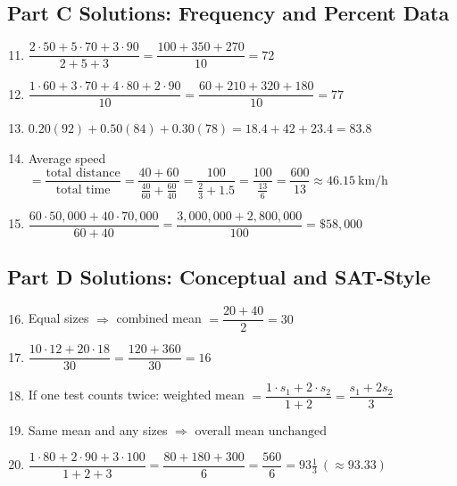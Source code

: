 \documentclass[14pt]{extarticle}
\begin{document}
\subsection*{Part C Solutions: Frequency and Percent Data}
\begin{enumerate}
  \setcounter{enumi}{10}
  \item \(\dfrac{2\cdot50+5\cdot70+3\cdot90}{2+5+3}=\dfrac{100+350+270}{10}=\boxed{72}\)
  \item \(\dfrac{1\cdot60+3\cdot70+4\cdot80+2\cdot90}{10}=\dfrac{60+210+320+180}{10}=\boxed{77}\)
  \item \(0.20(92)+0.50(84)+0.30(78)=18.4+42+23.4=\boxed{83.8}\)
  \item Average speed \(=\dfrac{\text{total distance}}{\text{total time}}=\dfrac{40+60}{\tfrac{40}{60}+\tfrac{60}{40}}=\dfrac{100}{\tfrac{2}{3}+1.5}=\dfrac{100}{\tfrac{13}{6}}=\dfrac{600}{13}\approx\boxed{46.15\ \text{km/h}}\)
  \item \(\dfrac{60\cdot 50{,}000+40\cdot 70{,}000}{60+40}=\dfrac{3{,}000{,}000+2{,}800{,}000}{100}=\boxed{\$58{,}000}\)
\end{enumerate}

\subsection*{Part D Solutions: Conceptual and SAT-Style}
\begin{enumerate}
  \setcounter{enumi}{15}
  \item Equal sizes \(\Rightarrow\) combined mean \(=\dfrac{20+40}{2}=\boxed{30}\)
  \item \(\dfrac{10\cdot12+20\cdot18}{30}=\dfrac{120+360}{30}=\boxed{16}\)
  \item If one test counts twice: weighted mean \(=\dfrac{1\cdot s_1+2\cdot s_2}{1+2}=\boxed{\dfrac{s_1+2s_2}{3}}\)
  \item Same mean and any sizes \(\Rightarrow\) overall mean \(\boxed{\text{unchanged}}\)
  \item \(\dfrac{1\cdot80+2\cdot90+3\cdot100}{1+2+3}=\dfrac{80+180+300}{6}=\dfrac{560}{6}=\boxed{93\tfrac{1}{3}}\ (\approx \boxed{93.33})\)
\end{enumerate}





\end{document}
